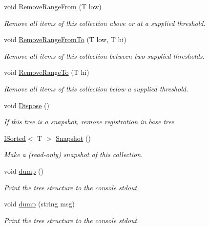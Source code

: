 \begin{DoxyCompactItemize}
void \hyperlink{class_c5_1_1_tree_set_ac4f7986dc66d6611037fe87fec51cfbf}{Remove\+Range\+From} (T low)
\begin{DoxyCompactList}\small\item\em Remove all items of this collection above or at a supplied threshold. \end{DoxyCompactList}\item 
void \hyperlink{class_c5_1_1_tree_set_a5b8587c9e2fdf326551f8c672d240135}{Remove\+Range\+From\+To} (T low, T hi)
\begin{DoxyCompactList}\small\item\em Remove all items of this collection between two supplied thresholds. \end{DoxyCompactList}\item 
void \hyperlink{class_c5_1_1_tree_set_a24d70b5745a9d56f5fefc37151daddf1}{Remove\+Range\+To} (T hi)
\begin{DoxyCompactList}\small\item\em Remove all items of this collection below a supplied threshold. \end{DoxyCompactList}\item 
void \hyperlink{class_c5_1_1_tree_set_a0e3fca9c34e7ff42864933aadb8ea457}{Dispose} ()
\begin{DoxyCompactList}\small\item\em If this tree is a snapshot, remove registration in base tree \end{DoxyCompactList}\item 
\hyperlink{interface_c5_1_1_i_sorted}{I\+Sorted}$<$ T $>$ \hyperlink{class_c5_1_1_tree_set_a1ba16497dd87ddae2e4345f9b7f083e2}{Snapshot} ()
\begin{DoxyCompactList}\small\item\em Make a (read-\/only) snapshot of this collection. \end{DoxyCompactList}\item 
void \hyperlink{class_c5_1_1_tree_set_aa000285b5cf85a40b6e42c7f425f67d7}{dump} ()
\begin{DoxyCompactList}\small\item\em Print the tree structure to the console stdout. \end{DoxyCompactList}\item 
void \hyperlink{class_c5_1_1_tree_set_aaffe2ed8d993d65e73216982caf60087}{dump} (string msg)
\begin{DoxyCompactList}\small\item\em Print the tree structure to the console stdout. \end{DoxyCompactList}\item 

\end{DoxyCompactItemize}
